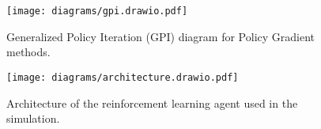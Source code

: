 \documentclass[11pt]{article}
\begin{document}
    \begin{figure}[htb]
        \centering
        \texttt{[image: diagrams/gpi.drawio.pdf]}
        \caption{Generalized Policy Iteration (GPI) diagram for Policy Gradient methods.}
        \label{fig:gpi}
    \end{figure}

    \begin{figure}[htb]
        \centering
        \texttt{[image: diagrams/architecture.drawio.pdf]}
        \caption{Architecture of the reinforcement learning agent used in the simulation.}
        \label{fig:agent}
    \end{figure}
\end{document}
